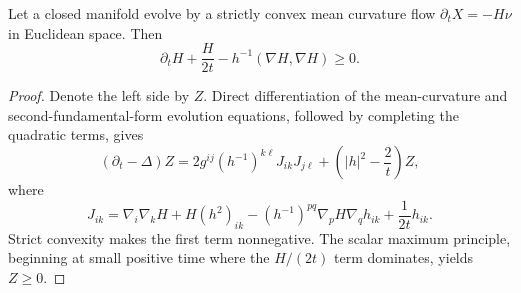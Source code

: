 \begin{theorem}
\label{thm:chow-ii-mean-curvature-flow-harnack}
Let a closed manifold evolve by a strictly convex mean curvature flow
\(\partial_tX=-H\nu\) in Euclidean space.  Then
\[
\partial_tH+\frac{H}{2t}-h^{-1}(\nabla H,\nabla H)\ge0.
\]
\end{theorem}
\begin{proof}
\sketch Denote the left side by \(Z\).  Direct differentiation of the mean-curvature
and second-fundamental-form evolution equations, followed by completing the
quadratic terms, gives
\[
(\partial_t-\Delta)Z
=2g^{ij}(h^{-1})^{k\ell}J_{ik}J_{j\ell}
+\left(|h|^2-\frac2t\right)Z,
\]
where
\[
J_{ik}=\nabla_i\nabla_kH+H(h^2)_{ik}
-(h^{-1})^{pq}\nabla_pH\nabla_qh_{ik}+\frac1{2t}h_{ik}.
\]
Strict convexity makes the first term nonnegative.  The scalar maximum
principle, beginning at small positive time where the \(H/(2t)\) term
dominates, yields \(Z\ge0\).
\end{proof}
